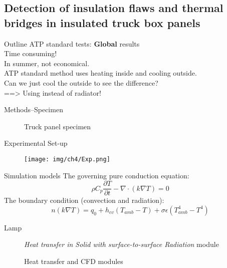 \subsection{Detection of insulation flaws and thermal bridges in insulated truck box panels}

\begin{frame}{Outline}
    ATP standard tests: \textbf{Global} results\\

    Time consuming!\\
    In summer, not economical.
    \\
    ATP standard method uses heating inside and cooling outside.\\
    Can we just cool the outside to see the difference?\\
    \pause
    ==> Using {\color{cyan}{compressed air}} instead of \alert{radiator!}
\end{frame}


\begin{frame}{Methods--Specimen}
    \begin{figure}[ht]
    \hspace*{-20pt}
    \pause
    \caption{Truck panel specimen}
    \end{figure}
 
\end{frame}


\begin{frame}{Experimental Set-up}
    \begin{figure}[ht]
        \centering
        \texttt{[image: img/ch4/Exp.png]}
    \end{figure}
\end{frame}

\begin{frame}{Simulation models}
 The governing pure conduction equation:
    \begin{equation*}
        \rho C_p \frac{\partial T}{\partial t}-\nabla \cdot (k\nabla T) = 0
    \end{equation*}
The boundary condition (convection and radiation):
    \begin{equation*}
        n(k\nabla T) = q_0 + h_{cv}(T_{amb}-T)+\sigma \epsilon(T_{amb}^4-T^4)
    \end{equation*}
\pause
    \begin{description}
        \item[Lamp {\color{red}{Heating}}] \textit{Heat transfer in Solid with surface-to-surface Radiation} module  
        \item[{\color{cyan}{Air Cooling}}] Heat transfer and CFD modules    
    \end{description}
\end{frame}

